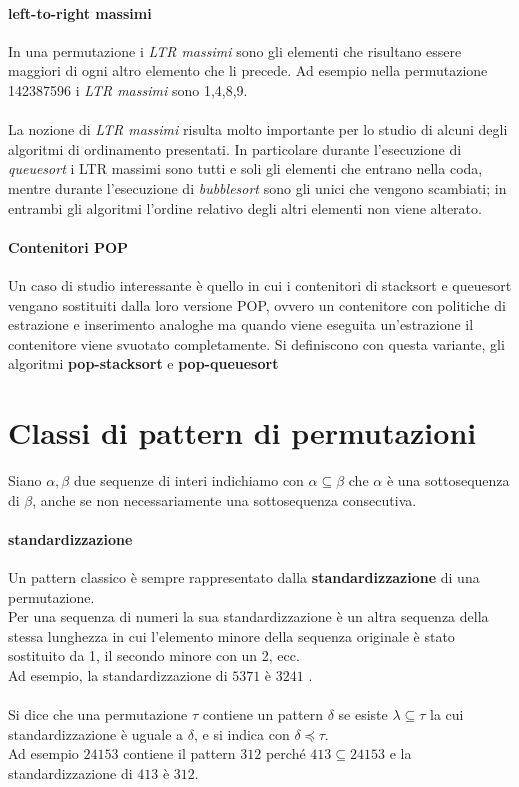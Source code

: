 \paragraph{left-to-right massimi} In una permutazione i \textit{LTR massimi} sono gli elementi che risultano essere maggiori di ogni altro elemento che li precede. Ad esempio nella permutazione 142387596 i \textit{LTR massimi} sono 1,4,8,9.\\\\
La nozione di \textit{LTR massimi} risulta molto importante per lo studio di alcuni degli algoritmi di ordinamento presentati. In particolare durante l'esecuzione di \textit{queuesort} i LTR massimi sono tutti e soli gli elementi che entrano nella coda, mentre durante l'esecuzione di \textit{bubblesort} sono gli unici che vengono scambiati; in entrambi gli algoritmi l'ordine relativo degli altri elementi non viene alterato.
\paragraph{Contenitori POP}Un caso di studio interessante \`e quello in cui i contenitori di stacksort e queuesort vengano sostituiti dalla loro versione POP, ovvero un contenitore con politiche di estrazione e inserimento analoghe ma quando viene eseguita un'estrazione il contenitore viene svuotato completamente. Si definiscono con questa variante, gli algoritmi \textbf{pop-stacksort} e \textbf{pop-queuesort} 
\section{Classi di pattern di permutazioni}
Siano $\alpha,\beta$ due sequenze di interi indichiamo con $\alpha \subseteq \beta$ che $\alpha$ \`e una sottosequenza di $\beta$, anche se non necessariamente una sottosequenza consecutiva\cite{bouvel2022preimages}.
\paragraph{standardizzazione}
Un pattern classico \`e sempre rappresentato dalla \textbf{standardizzazione} di una permutazione.\\Per una sequenza di numeri la sua standardizzazione\cite{claesson2012sorting} \`e un altra sequenza della stessa lunghezza in cui l'elemento minore della sequenza originale \`e stato sostituito da 1, il secondo minore con un 2, ecc.\\
Ad esempio, la standardizzazione di $5371$ \`e $3241$ .\\\\
Si dice che una permutazione $\tau$ contiene un pattern $\delta$ se esiste $\lambda\subseteq\tau$ la cui standardizzazione \`e uguale a $\delta$, e si indica con $\delta\preceq\tau$. \\Ad esempio $24153$ contiene il pattern $312$ perch\'e $413\subseteq{24153}$ e la standardizzazione di $413$ \`e $312$.
